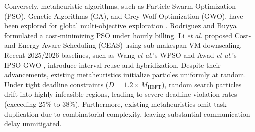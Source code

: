 \documentclass[journal]{IEEEtran}
\begin{document}
Conversely, metaheuristic algorithms, such as Particle Swarm Optimization (PSO), Genetic Algorithms (GA), and Grey Wolf Optimization (GWO), have been explored for global multi-objective exploration \cite{rodriguez2014cost, wpso2025wang, awad2026ipso}. Rodriguez and Buyya \cite{rodriguez2014cost} formulated a cost-minimizing PSO under hourly billing. Li \textit{et al.} \cite{ceas2018li} proposed Cost- and Energy-Aware Scheduling (CEAS) using sub-makespan VM downscaling. Recent 2025/2026 baselines, such as Wang \textit{et al.}'s WPSO \cite{wpso2025wang} and Awad \textit{et al.}'s IPSO-GWO \cite{awad2026ipso}, introduce interval reuse and hybridization. Despite their advancements, existing metaheuristics initialize particles uniformly at random. Under tight deadline constraints ($D = 1.2 \times M_{\text{HEFT}}$), random search particles drift into highly infeasible regions, leading to severe deadline violation rates (exceeding 25\% to 38\%). Furthermore, existing metaheuristics omit task duplication due to combinatorial complexity, leaving substantial communication delay unmitigated.
\end{document}
